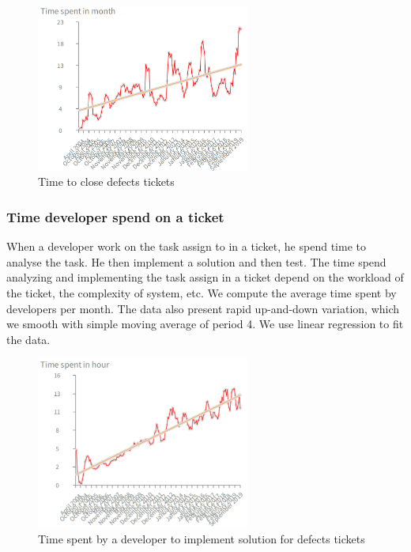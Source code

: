 \documentclass[10pt,conference]{IEEEtran}
\begin{document}
\begin{figure}[H]
  \centering
  \includegraphics[width=70mm]{./images/openCloseBug.png}
  \caption{Time to close defects tickets}
  \label{fig:defect}
\end{figure}




\subsubsection{Time developer spend on a ticket }

When a developer work on the task assign to in a ticket, he spend time to analyse  the task. 
He then implement a solution and then test.
 The time spend analyzing and implementing the task assign in a ticket depend on the workload  of the ticket, the complexity of system, etc.  
We compute the average time spent by developers per month. 
The data also present rapid up-and-down variation, which we smooth with simple moving average of period 4. We use  linear regression to fit the data.   

\begin{figure}[H]
  \centering
  \includegraphics[width=70mm]{./images/devDefect.png}
  \caption{Time spent by a developer to implement solution for  defects tickets}
  \label{fig:devTimeDefect}
\end{figure}
\end{document}
